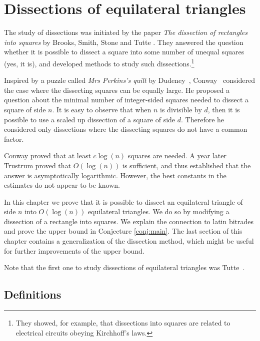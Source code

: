 \chapter{Dissections of equilateral triangles}
\label{chap:dissections}

The study of dissections was initiated by the paper \emph{The dissection of rectangles into squares} by Brooks, Smith, Stone and Tutte \cite{BrooksSmithStoneTutte40}. They answered the question whether it is possible to dissect a square into some number of unequal squares (yes, it is), and developed methods to study such dissections.\footnote{They showed, for example, that dissections into squares are related to electrical circuits obeying Kirchhoff's laws.}

Inspired by a puzzle called \emph{Mrs Perkins's quilt} by Dudeney~\cite{Dudeney17}, Conway~\cite{Conway64} considered the case where the dissecting squares can be equally large. He proposed a question about the minimal number of integer-sided squares needed to dissect a square of side $n$. It is easy to observe that when $n$ is divisible by $d$, then it is possible to use a scaled up dissection of a square of side $d$. Therefore he considered only dissections where the dissecting squares do not have a common factor.

Conway proved that at least $c \log(n)$ squares are needed. A year later Trustrum \cite{Trustrum65} proved that $O(\log(n))$ is sufficient, and thus established that the answer is asymptotically logarithmic. However, the best constants in the estimates do not appear to be known.

\bigskip

In this chapter we prove that it is possible to dissect an equilateral triangle of side $n$ into $O(\log(n))$ equilateral triangles. We do so by modifying a dissection of a rectangle into squares. We explain the connection to latin bitrades and prove the upper bound in Conjecture \ref{conj:main}. The last section of this chapter contains a generalization of the dissection method, which might be useful for further improvements of the upper bound.

\bigskip

Note that the first one to study dissections of equilateral triangles was Tutte~\cite{Tutte48}. 


\section{Definitions}

